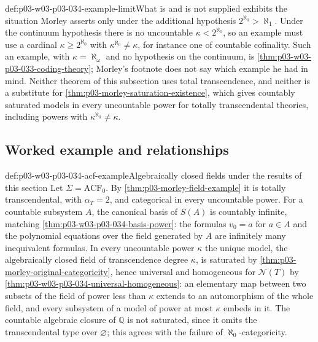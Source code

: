 \begin{hbwarning}{def:p03-w03-p03-034-example-limit}{What is and is not supplied}
 exhibits the situation Morley
asserts only under the additional hypothesis \(2^{\aleph_0}>\aleph_1\).
Under the continuum hypothesis there is no uncountable
\(\kappa<2^{\aleph_0}\), so an example must use a cardinal
\(\kappa\geq2^{\aleph_0}\) with \(\kappa^{\aleph_0}\neq\kappa\), for
instance one of countable cofinality. Such an example, with
\(\kappa=\aleph_\omega\) and no hypothesis on the continuum, is
\cref{thm:p03-w03-p03-033-coding-theory}; Morley's footnote does not say
which example he had in mind. Neither theorem of this subsection uses total
transcendence, and neither is a substitute for
\cref{thm:p03-morley-saturation-existence}, which gives countably saturated
models in every uncountable power for totally transcendental theories,
including powers with \(\kappa^{\aleph_0}\neq\kappa\).
\end{hbwarning}

\subsection{Worked example and relationships}
\label{sec:p03-w03-p03-034-example}

\begin{hbexample}{def:p03-w03-p03-034-acf-example}{Algebraically closed fields under the results of this section}
Let \(\Sigma=\mathrm{ACF}_0\). By \cref{thm:p03-morley-field-example} it
is totally transcendental, with \(\alpha_T=2\), and categorical in every
uncountable power. For a countable subsystem \(A\), the canonical basis of
\(S(A)\) is countably infinite, matching
\cref{thm:p03-w03-p03-034-basis-power}: the formulas \(v_0=a\) for
\(a\in A\) and the polynomial equations over the field generated by \(A\)
are infinitely many inequivalent formulas. In every uncountable power
\(\kappa\) the unique model, the algebraically closed field of
transcendence degree \(\kappa\), is saturated by
\cref{thm:p03-morley-original-categoricity}, hence universal and homogeneous
for \(\mathcal N(T)\) by \cref{thm:p03-w03-p03-034-universal-homogeneous}:
an elementary map between two subsets of the field of power less than
\(\kappa\) extends to an automorphism of the whole field, and every
subsystem of a model of power at most \(\kappa\) embeds in it. The
countable algebraic closure of \(\mathbb Q\) is not saturated, since it
omits the transcendental type over \(\varnothing\); this agrees with the
failure of \(\aleph_0\)-categoricity.
\end{hbexample}

